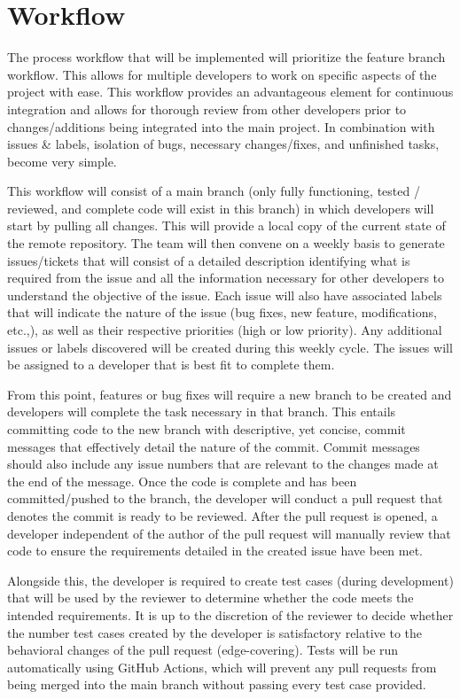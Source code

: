 \documentclass[12pt,a4]{report}
\begin{document}
\section*{Workflow}
The process workflow that will be implemented will prioritize the feature branch workflow. This allows for multiple developers to work on specific aspects of the project with ease. This workflow provides an advantageous element for continuous integration and allows for thorough review from other developers prior to changes/additions being integrated into the main project. In combination with issues \& labels, isolation of bugs, necessary changes/fixes, and unfinished tasks, become very simple. 

This workflow will consist of a main branch (only fully functioning, tested / reviewed, and complete code will exist in this branch) in which developers will start by pulling all changes. This will provide a local copy of the current state of the remote repository. The team will then convene on a weekly basis to generate issues/tickets that will consist of a detailed description identifying what is required from the issue and all the information necessary for other developers to understand the objective of the issue. Each issue will also have associated labels that will indicate the nature of the issue (bug fixes, new feature, modifications, etc.,), as well as their respective priorities (high or low priority). Any additional issues or labels discovered will be created during this weekly cycle. The issues will be assigned to a developer that is best fit to complete them. 

From this point, features or bug fixes will require a new branch to be created and developers will complete the task necessary in that branch. This entails committing code to the new branch with descriptive, yet concise, commit messages that effectively detail the nature of the commit. Commit messages should also include any issue numbers that are relevant to the changes made at the end of the message. Once the code is complete and has been committed/pushed to the branch, the developer will conduct a pull request that denotes the commit is ready to be reviewed. After the pull request is opened, a developer independent of the author of the pull request will manually review that code to ensure the requirements detailed in the created issue have been met. 

Alongside this, the developer is required to create test cases (during development) that will be used by the reviewer to determine whether the code meets the intended requirements. It is up to the discretion of the reviewer to decide whether the number test cases created by the developer is satisfactory relative to the behavioral changes of the pull request (edge-covering). Tests will be run automatically using GitHub Actions, which will prevent any pull requests from being merged into the main branch without passing every test case provided. 
\end{document}
